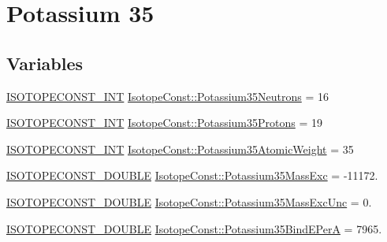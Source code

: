 \hypertarget{group___isotope_const-_potassium-_k35}{}\section{Potassium 35}
\label{group___isotope_const-_potassium-_k35}
\subsection*{Variables}
\begin{DoxyCompactItemize}
\item 
\mbox{\hyperlink{group___isotope_const-_macros_ga5f18360b3e99483a35c32d789e62621c}{I\+S\+O\+T\+O\+P\+E\+C\+O\+N\+S\+T\+\_\+\+I\+NT}} \mbox{\hyperlink{group___isotope_const-_potassium-_k35_gabb10706b5d7ea012a6bbb10d11906165}{Isotope\+Const\+::\+Potassium35\+Neutrons}} = 16
\item 
\mbox{\hyperlink{group___isotope_const-_macros_ga5f18360b3e99483a35c32d789e62621c}{I\+S\+O\+T\+O\+P\+E\+C\+O\+N\+S\+T\+\_\+\+I\+NT}} \mbox{\hyperlink{group___isotope_const-_potassium-_k35_gad5371e2d5e8bd27e40b950cf99f3da94}{Isotope\+Const\+::\+Potassium35\+Protons}} = 19
\item 
\mbox{\hyperlink{group___isotope_const-_macros_ga5f18360b3e99483a35c32d789e62621c}{I\+S\+O\+T\+O\+P\+E\+C\+O\+N\+S\+T\+\_\+\+I\+NT}} \mbox{\hyperlink{group___isotope_const-_potassium-_k35_gaf7d56a6836fc53bd817ef05ad8866f46}{Isotope\+Const\+::\+Potassium35\+Atomic\+Weight}} = 35
\item 
\mbox{\hyperlink{group___isotope_const-_macros_ga8f45a7272ce02c0b4c65c44636ed719a}{I\+S\+O\+T\+O\+P\+E\+C\+O\+N\+S\+T\+\_\+\+D\+O\+U\+B\+LE}} \mbox{\hyperlink{group___isotope_const-_potassium-_k35_ga68d3213bbb6acae966e81e4d8c903b0c}{Isotope\+Const\+::\+Potassium35\+Mass\+Exc}} = -\/11172.
\item 
\mbox{\hyperlink{group___isotope_const-_macros_ga8f45a7272ce02c0b4c65c44636ed719a}{I\+S\+O\+T\+O\+P\+E\+C\+O\+N\+S\+T\+\_\+\+D\+O\+U\+B\+LE}} \mbox{\hyperlink{group___isotope_const-_potassium-_k35_ga60a20c16b6d724cf8a57c58da545d921}{Isotope\+Const\+::\+Potassium35\+Mass\+Exc\+Unc}} = 0.
\item 
\mbox{\hyperlink{group___isotope_const-_macros_ga8f45a7272ce02c0b4c65c44636ed719a}{I\+S\+O\+T\+O\+P\+E\+C\+O\+N\+S\+T\+\_\+\+D\+O\+U\+B\+LE}} \mbox{\hyperlink{group___isotope_const-_potassium-_k35_ga0ec663da1d102bfd89ea5137a0c743dc}{Isotope\+Const\+::\+Potassium35\+Bind\+E\+PerA}} = 7965.
\item 

\end{DoxyCompactItemize}
